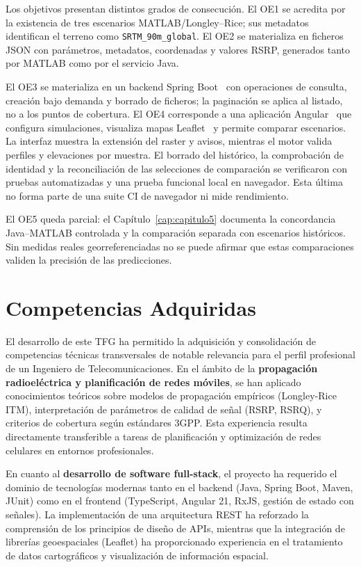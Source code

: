 Los objetivos presentan distintos grados de consecución. El OE1 se acredita por la existencia de tres escenarios MATLAB/Longley--Rice; sus metadatos identifican el terreno como \texttt{SRTM\_90m\_global}. El OE2 se materializa en ficheros JSON con parámetros, metadatos, coordenadas y valores RSRP, generados tanto por MATLAB como por el servicio Java.

El OE3 se materializa en un backend Spring Boot~\cite{spring_boot_docs} con operaciones de consulta, creación bajo demanda y borrado de ficheros; la paginación se aplica al listado, no a los puntos de cobertura. El OE4 corresponde a una aplicación Angular~\cite{angular_docs} que configura simulaciones, visualiza mapas Leaflet~\cite{leaflet_docs} y permite comparar escenarios. La interfaz muestra la extensión del raster y avisos, mientras el motor valida perfiles y elevaciones por muestra. El borrado del histórico, la comprobación de identidad y la reconciliación de las selecciones de comparación se verificaron con pruebas automatizadas y una prueba funcional local en navegador. Esta última no forma parte de una suite CI de navegador ni mide rendimiento.

El OE5 queda parcial: el Capítulo~\ref{cap:capitulo5} documenta la concordancia
Java--MATLAB controlada y la comparación separada con escenarios históricos.
Sin medidas reales georreferenciadas no se puede afirmar que estas comparaciones
validen la precisión de las predicciones.

\section{Competencias Adquiridas}
\label{sec:competencias}

El desarrollo de este TFG ha permitido la adquisición y consolidación de competencias técnicas transversales de notable relevancia para el perfil profesional de un Ingeniero de Telecomunicaciones. En el ámbito de la \textbf{propagación radioeléctrica y planificación de redes móviles}, se han aplicado conocimientos teóricos sobre modelos de propagación empíricos (Longley-Rice ITM), interpretación de parámetros de calidad de señal (RSRP, RSRQ), y criterios de cobertura según estándares 3GPP. Esta experiencia resulta directamente transferible a tareas de planificación y optimización de redes celulares en entornos profesionales.

En cuanto al \textbf{desarrollo de software full-stack}, el proyecto ha requerido el dominio de tecnologías modernas tanto en el backend (Java, Spring Boot, Maven, JUnit) como en el frontend (TypeScript, Angular 21, RxJS, gestión de estado con señales). La implementación de una arquitectura REST ha reforzado la comprensión de los principios de diseño de APIs, mientras que la integración de librerías geoespaciales (Leaflet) ha proporcionado experiencia en el tratamiento de datos cartográficos y visualización de información espacial.


